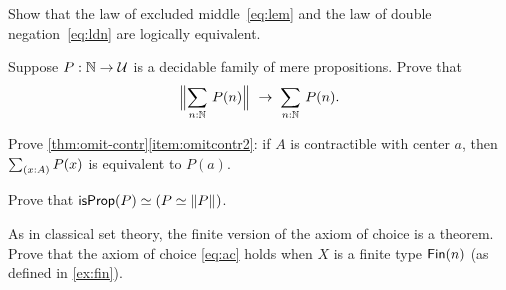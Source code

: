 \begin{ex}\label{ex:lem-ldn}
  Show that the law of excluded middle~\eqref{eq:lem} and the law of double negation~\eqref{eq:ldn} are logically equivalent.
\end{ex}

\begin{ex}\label{ex:decidable-choice}
  Suppose $P:\mathbb{N}\to\mathcal{U}$ is a decidable family of mere propositions.
  Prove that
  \[ \Brck{\sm{n:\nat} P(n)} \;\to\; \sm{n:\nat}P(n).\]
\end{ex}

\begin{ex}\label{ex:omit-contr2}
  Prove \autoref{thm:omit-contr}\ref{item:omitcontr2}: if $A$ is contractible with center $a$, then $\sm{x:A} P(x)$ is equivalent to $P(a)$.
\end{ex}

\begin{ex}\label{ex:isprop-equiv-equiv-bracket}
  Prove that $\mathsf{isProp}(P) \simeq (P \simeq \mathopen{}\left\Vert P\right\Vert_{}\mathclose{})$.
\end{ex}

\begin{ex}\label{ex:finite-choice}
  As in classical set theory, the finite version of the axiom of choice is a theorem.  Prove that the axiom of choice \eqref{eq:ac} holds when $X$ is a finite type $\mathsf{Fin}(n)$ (as defined in \autoref{ex:fin}).
\end{ex}

